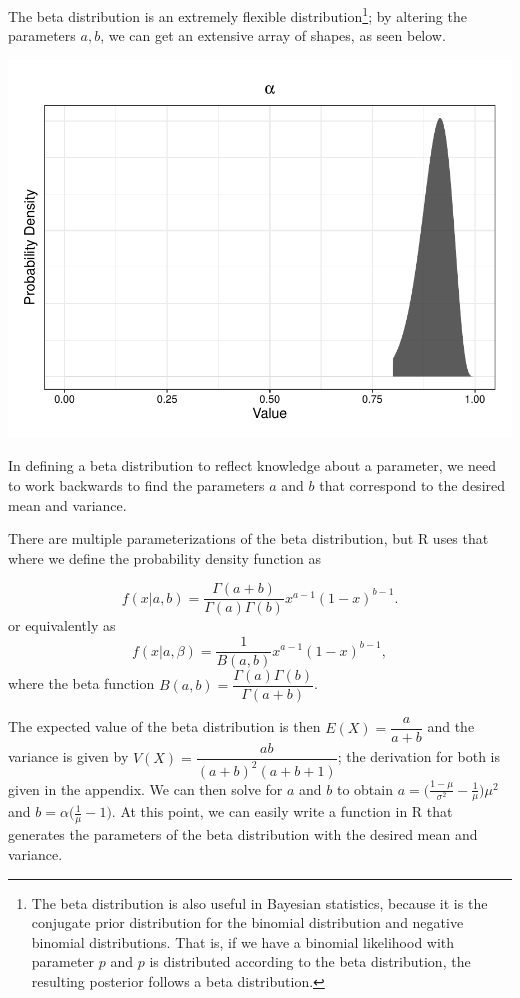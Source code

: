 \documentclass[12pt,twoside]{smiththesis}
\begin{document}
The beta distribution is an extremely flexible distribution\footnote{The beta distribution is also useful in Bayesian statistics, because it is the conjugate prior distribution for the binomial distribution and negative binomial distributions. That is, if we have a binomial likelihood with parameter \(p\) and \(p\) is distributed according to the beta distribution, the resulting posterior follows a beta distribution.}; by altering the parameters \(a,b\), we can get an extensive array of shapes, as seen below.
\begin{center}\includegraphics[width=0.9\linewidth]{thesis_files/figure-latex/unnamed-chunk-48-1} \end{center}

In defining a beta distribution to reflect knowledge about a parameter, we need to work backwards to find the parameters \(a\) and \(b\) that correspond to the desired mean and variance.

There are multiple parameterizations of the beta distribution, but R uses that where we define the probability density function as

\[
f(x|a,b) = \dfrac{\Gamma(a + b)}{\Gamma(a) \Gamma(b)} x^{a - 1} (1-x)^{b - 1}.
\]
or equivalently as
\[
f(x|a,\beta) = \dfrac{1}{B(a,b)} x^{a - 1} (1-x)^{b - 1},
\]
where the beta function \(B(a, b) = \dfrac{\Gamma(a)\Gamma(b) }{\Gamma ( a + b)}\).

The expected value of the beta distribution is then \(E(X) = \dfrac{a}{a + b}\) and the variance is given by \(V(X) = \dfrac{a b}{(a + b)^2(a +b + 1)}\); the derivation for both is given in the appendix. We can then solve for \(a\) and \(b\) to obtain \(a = \Big(\frac{1-\mu}{\sigma^2} - \frac{1}{\mu}\Big) \mu^2\) and \(b = \alpha\Big(\frac{1}{\mu} - 1\Big)\). At this point, we can easily write a function in R that generates the parameters of the beta distribution with the desired mean and variance.
\end{document}
